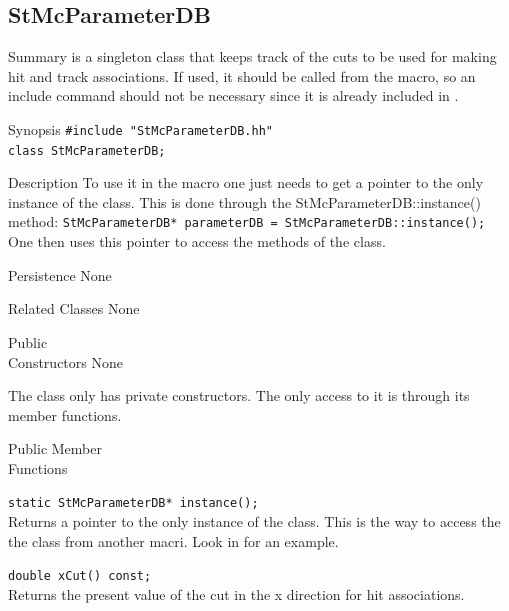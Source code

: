 \subsection{StMcParameterDB}
\label{sec:StMcParameterDB}
\begin{Entry}
\item[Summary]
     is a singleton class that keeps track
    of the cuts to be used for making hit and track associations.
    If used, it should be called from the macro, so an include command
    should not be necessary since it is already included in
    .  

\item[Synopsis]
    \verb+#include "StMcParameterDB.hh"+\\
    \verb+class StMcParameterDB;+\\

\item[Description]
    To use it in the macro one just needs to get a pointer to the only instance
    of the class.  This is done through the StMcParameterDB::instance() method:
     \verb+StMcParameterDB* parameterDB = StMcParameterDB::instance();+\\

    One then uses this pointer to access the methods of the class.

\item[Persistence]
    None

\item[Related Classes]
    None

\item[Public\\ Constructors]
    None
    
    The class only has private constructors. The only access to it is through its member
    functions.

\item[Public Member\\ Functions]

    \verb+static StMcParameterDB* instance();+\\
    Returns a pointer to the only instance of the class.  This is the way to access the
    the class from another macri.  Look in  for an example.

    \verb+double xCut() const;+\\
    Returns the present value of the cut in the x direction for hit associations.


\end{Entry}
